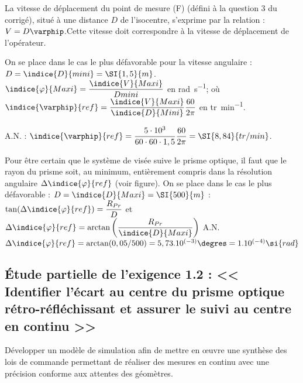 \ifprof
\begin{corrige}
La vitesse de déplacement du point de mesure (F) (défini à la question 3 du corrigé), situé à une distance $D$ de l’isocentre, s’exprime par la relation : $V=D\varphip$.Cette vitesse doit correspondre à la vitesse de déplacement de l’opérateur. 

On se place dans le cas le plus défavorable pour la vitesse angulaire : $D=\indice{D}{mini} = \SI{1,5}{m}$. 
$\indice{\varphi}{Maxi} = \dfrac{\indice{V}{Maxi}}{{D}{mini}}$ en \si{rad.s^{-1}};  où 
$\indice{\varphip}{ref} = \dfrac{\indice{V}{Maxi}}{\indice{D}{Mini}} \dfrac{60}{2\pi}$ en \si{tr.min^{-1}}.

A.N. : $\indice{\varphip}{ref} = \dfrac{5\cdot 10^3 }{60\cdot 60\cdot 1,5} \dfrac{60}{2\pi} =\SI{8,84}{tr/min}$.

Pour être certain que le système de visée suive le prisme optique, il faut que le rayon du prisme soit, au minimum, entièrement compris dans la résolution angulaire $\Delta \indice{\varphi}{ref}$ (voir figure).
On se place dans le cas le plus défavorable : $D=\indice{D}{Maxi} =\SI{500}{m}$ :  
$\tan(\Delta \indice{\varphi}{ref})=\dfrac{R_{Pr}}{D}$ et $\Delta \indice{\varphi}{ref}=\arctan\left(\dfrac{R_{Pr}}{\indice{D}{Maxi}}\right)$
A.N.  $\Delta \indice{\varphi}{ref}=\arctan(0,05/500)=5,73.10^{(-3)}\degres =1.10^{(-4)} \si{rad}$

\end{corrige}
\else
\fi


\subsection{Étude partielle de l'exigence 1.2 : << Identifier l'écart au centre du prisme optique rétro-réfléchissant et assurer le suivi au centre en continu >>}
\begin{obj}
Développer un modèle de simulation afin de mettre en œuvre une synthèse des lois de commande permettant de réaliser des mesures en continu avec une précision conforme aux attentes des géomètres.
\end{obj}

